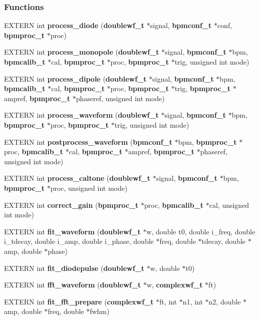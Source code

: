 \subsubsection*{Functions}
\begin{CompactItemize}
\item 
EXTERN int {\bf process\_\-diode} ({\bf doublewf\_\-t} $\ast$signal, {\bf bpmconf\_\-t} $\ast$conf, {\bf bpmproc\_\-t} $\ast$proc)
\item 
EXTERN int {\bf process\_\-monopole} ({\bf doublewf\_\-t} $\ast$signal, {\bf bpmconf\_\-t} $\ast$bpm, {\bf bpmcalib\_\-t} $\ast$cal, {\bf bpmproc\_\-t} $\ast$proc, {\bf bpmproc\_\-t} $\ast$trig, unsigned int mode)
\item 
EXTERN int {\bf process\_\-dipole} ({\bf doublewf\_\-t} $\ast$signal, {\bf bpmconf\_\-t} $\ast$bpm, {\bf bpmcalib\_\-t} $\ast$cal, {\bf bpmproc\_\-t} $\ast$proc, {\bf bpmproc\_\-t} $\ast$trig, {\bf bpmproc\_\-t} $\ast$ampref, {\bf bpmproc\_\-t} $\ast$phaseref, unsigned int mode)
\item 
EXTERN int {\bf process\_\-waveform} ({\bf doublewf\_\-t} $\ast$signal, {\bf bpmconf\_\-t} $\ast$bpm, {\bf bpmproc\_\-t} $\ast$proc, {\bf bpmproc\_\-t} $\ast$trig, unsigned int mode)
\item 
EXTERN int {\bf postprocess\_\-waveform} ({\bf bpmconf\_\-t} $\ast$bpm, {\bf bpmproc\_\-t} $\ast$proc, {\bf bpmcalib\_\-t} $\ast$cal, {\bf bpmproc\_\-t} $\ast$ampref, {\bf bpmproc\_\-t} $\ast$phaseref, unsigned int mode)
\item 
EXTERN int {\bf process\_\-caltone} ({\bf doublewf\_\-t} $\ast$signal, {\bf bpmconf\_\-t} $\ast$bpm, {\bf bpmproc\_\-t} $\ast$proc, unsigned int mode)
\item 
EXTERN int {\bf correct\_\-gain} ({\bf bpmproc\_\-t} $\ast$proc, {\bf bpmcalib\_\-t} $\ast$cal, unsigned int mode)
\item 
EXTERN int {\bf fit\_\-waveform} ({\bf doublewf\_\-t} $\ast$w, double t0, double i\_\-freq, double i\_\-tdecay, double i\_\-amp, double i\_\-phase, double $\ast$freq, double $\ast$tdecay, double $\ast$amp, double $\ast$phase)
\item 
EXTERN int {\bf fit\_\-diodepulse} ({\bf doublewf\_\-t} $\ast$w, double $\ast$t0)
\item 
EXTERN int {\bf fft\_\-waveform} ({\bf doublewf\_\-t} $\ast$w, {\bf complexwf\_\-t} $\ast$ft)
\item 
EXTERN int {\bf fit\_\-fft\_\-prepare} ({\bf complexwf\_\-t} $\ast$ft, int $\ast$n1, int $\ast$n2, double $\ast$amp, double $\ast$freq, double $\ast$fwhm)

\end{CompactItemize}
